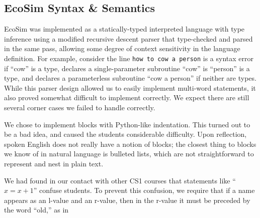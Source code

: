 \documentclass{sig-alternate}
\newenvironment{snippet}{\begin{algorithmic}[1]}{\end{algorithmic}}
\begin{document}
\subsection{EcoSim Syntax \& Semantics}
EcoSim was implemented as a statically-typed interpreted language with type inference
using a modified recursive descent parser that type-checked and parsed in the same pass,
allowing some degree of context sensitivity in the language definition.
For example, consider the line \texttt{how to cow a person}
is a syntax error if ``cow'' is a type,
declares a single-parameter subroutine ``cow'' is ``person'' is a type,
and declares a parameterless subroutine ``cow a person'' if neither are types.
While this parser design allowed us to easily implement multi-word statements,
it also proved somewhat difficult to implement correctly.
We expect there are still several corner cases we failed to handle correctly.

We chose to implement blocks with Python-like indentation.
This turned out to be a bad idea, and caused the students considerable difficulty.
Upon reflection, spoken English does not really have a notion of blocks;
the closest thing to blocks we know of in natural language is bulleted lists,
which are not straightforward to represent and nest in plain text.

We had found in our contact with other CS1 courses that statements like ``$x = x + 1$'' confuse students.
To prevent this confusion, we require that if a name appears as an l-value and an r-value,
then in the r-value it must be preceded by the word ``old,'' as in
\begin{snippet}
\end{snippet}
\end{document}
